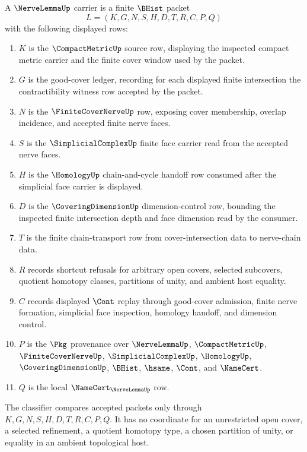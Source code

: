 \begin{definition}
\label{def:nerve-lemma-carrier}
A $\NerveLemmaUp$ carrier is a finite $\BHist$ packet
$$
L=(K,G,N,S,H,D,T,R,C,P,Q)
$$
with the following displayed rows:
\begin{enumerate}
\item $K$ is the $\CompactMetricUp$ source row, displaying the inspected compact metric carrier and the finite cover window used by the packet.
\item $G$ is the good-cover ledger, recording for each displayed finite intersection the contractibility witness row accepted by the packet.
\item $N$ is the $\FiniteCoverNerveUp$ row, exposing cover membership, overlap incidence, and accepted finite nerve faces.
\item $S$ is the $\SimplicialComplexUp$ finite face carrier read from the accepted nerve faces.
\item $H$ is the $\HomologyUp$ chain-and-cycle handoff row consumed after the simplicial face carrier is displayed.
\item $D$ is the $\CoveringDimensionUp$ dimension-control row, bounding the inspected finite intersection depth and face dimension read by the consumer.
\item $T$ is the finite chain-transport row from cover-intersection data to nerve-chain data.
\item $R$ records shortcut refusals for arbitrary open covers, selected subcovers, quotient homotopy classes, partitions of unity, and ambient host equality.
\item $C$ records displayed $\Cont$ replay through good-cover admission, finite nerve formation, simplicial face inspection, homology handoff, and dimension control.
\item $P$ is the $\Pkg$ provenance over $\NerveLemmaUp$, $\CompactMetricUp$, $\FiniteCoverNerveUp$, $\SimplicialComplexUp$, $\HomologyUp$, $\CoveringDimensionUp$, $\BHist$, $\hsame$, $\Cont$, and $\NameCert$.
\item $Q$ is the local $\NameCert_{\NerveLemmaUp}$ row.
\end{enumerate}
The classifier compares accepted packets only through $K,G,N,S,H,D,T,R,C,P,Q$. It has no coordinate for an unrestricted open cover, a selected refinement, a quotient homotopy type, a chosen partition of unity, or equality in an ambient topological host.
\end{definition}

